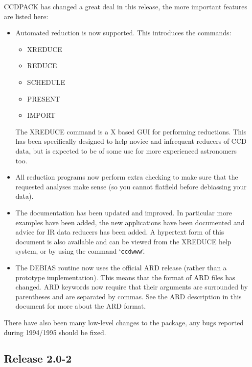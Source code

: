 \documentclass[twoside,11pt]{article}
\newcommand{\htmlref}[2]{#1}
\newcommand{\latexhtml}[2]{#1}
\newcommand{\xref}[3]{#1}
\renewcommand{\_}{\texttt{\symbol{95}}}
\newcommand{\ttsize}{\latexhtml{\small}{}}
\newcommand{\text}[1]{{\ttsize \tt #1}}
\newcommand{\xroutine}[1]{\htmlref{{\sc #1}}{#1}}
\begin{document}
CCDPACK has changed a great deal in this release, the more important
features are listed here:
\begin{itemize}
   \item Automated reduction is now supported. This introduces the commands:
      \begin{itemize}
         \item \xroutine{XREDUCE}
         \item \xroutine{REDUCE}
         \item \xroutine{SCHEDULE}
         \item \xroutine{PRESENT}
        \item \xroutine{IMPORT}
      \end{itemize}
      The \xroutine{XREDUCE} command is a X based GUI for performing
      reductions.  This has been specifically designed to help novice
      and infrequent reducers of CCD data, but is expected to be of
      some use for more experienced astronomers too.

  \item All reduction programs now perform extra checking to make sure
        that the requested analyses make sense (so you cannot flatfield
        before debiassing your data).

  \item The documentation has been updated and improved. In particular
        more examples have been added, the new applications have been
        documented and advice for IR data reducers has been added.
        A hypertext form of this document is also available and can be
        viewed from the \xroutine{XREDUCE} help system, or by using the
        command `\text{ccdwww}'.

  \item The \xroutine{DEBIAS} routine now uses the official
        \xref{ARD}{sun183}{} release (rather than a prototype
        implementation). This means that the format of ARD files has
        changed. ARD keywords now require that their arguments are
        surrounded by parentheses and are separated by commas. See the
        ARD description in this document for more about the ARD format.
\end{itemize}

There have also been many low-level changes to the package, any
bugs reported during 1994/1995 should be fixed.

\subsection{Release 2.0-2}
\end{document}
